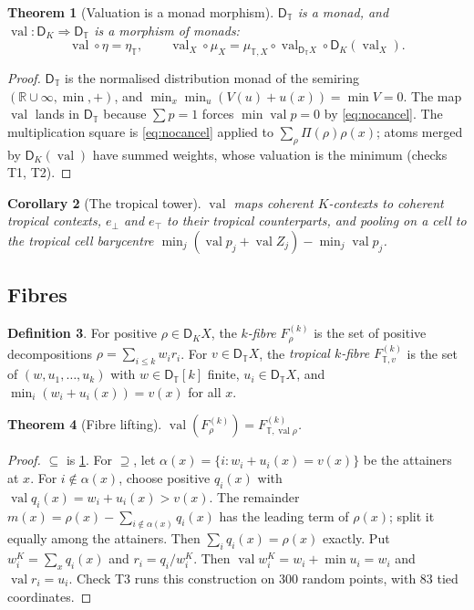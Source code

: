 \documentclass[11pt]{article}
\newtheorem{theorem}{Theorem}[section]
\newtheorem{corollary}[theorem]{Corollary}
\theoremstyle{definition}
\newtheorem{definition}[theorem]{Definition}
\newcommand{\DT}{\mathsf D_{\mathbb T}}
\newcommand{\DK}{\mathsf D_{K}}
\newcommand{\T}{\mathbb T}
\newcommand{\R}{\mathbb R}
\newcommand{\ebot}{e_{\perp}}
\newcommand{\etop}{e_{\top}}
\newcommand{\val}{\operatorname{val}}
\begin{document}
\begin{theorem}[Valuation is a monad morphism]\label{thm:monad}
$\DT$ is a monad, and $\val\colon\DK\Rightarrow\DT$ is a morphism of monads:
\[
\val\circ\eta=\eta_\T,\qquad\val_X\circ\mu_X=\mu_{\T,X}\circ\val_{\DT X}\circ\DK(\val_X).
\]
\end{theorem}
\begin{proof}
$\DT$ is the normalised distribution monad of the semiring $(\R\cup\infty,\min,+)$, and $\min_x\min_u(V(u)+u(x))=\min V=0$. The map
$\val$ lands in $\DT$ because $\sum p=1$ forces $\min\val p=0$ by \eqref{eq:nocancel}. The multiplication square is
\eqref{eq:nocancel} applied to $\sum_\rho\Pi(\rho)\rho(x)$; atoms merged by $\DK(\val)$ have summed weights, whose valuation is the
minimum (checks T1, T2).
\end{proof}

\begin{corollary}[The tropical tower]\label{cor:tower}
$\val$ maps coherent $K$-contexts to coherent tropical contexts, $\ebot$ and $\etop$ to their tropical counterparts, and pooling on a
cell to the tropical cell barycentre $\min_j(\val p_j+\val Z_j)-\min_j\val p_j$.
\end{corollary}

\subsection{Fibres}
\begin{definition}
For positive $\rho\in\DK X$, the \emph{$k$-fibre} $F^{(k)}_\rho$ is the set of positive decompositions $\rho=\sum_{i\le k}w_ir_i$. For
$v\in\DT X$, the \emph{tropical $k$-fibre} $F^{(k)}_{\T,v}$ is the set of $(w,u_1,\dots,u_k)$ with $w\in\DT[k]$ finite, $u_i\in\DT X$,
and $\min_i(w_i+u_i(x))=v(x)$ for all $x$.
\end{definition}

\begin{theorem}[Fibre lifting]\label{thm:lift}
$\val(F^{(k)}_\rho)=F^{(k)}_{\T,\val\rho}$.
\end{theorem}
\begin{proof}
$\subseteq$ is \cref{thm:monad}. For $\supseteq$, let $\alpha(x)=\{i:w_i+u_i(x)=v(x)\}$ be the attainers at $x$. For $i\notin\alpha(x)$,
choose positive $q_i(x)$ with $\val q_i(x)=w_i+u_i(x)>v(x)$. The remainder $m(x)=\rho(x)-\sum_{i\notin\alpha(x)}q_i(x)$ has the leading
term of $\rho(x)$; split it equally among the attainers. Then $\sum_iq_i(x)=\rho(x)$ exactly. Put $w_i^K=\sum_xq_i(x)$ and
$r_i=q_i/w_i^K$. Then $\val w_i^K=w_i+\min u_i=w_i$ and $\val r_i=u_i$. Check T3 runs this construction on 300 random points, with
83 tied coordinates.
\end{proof}
\end{document}
